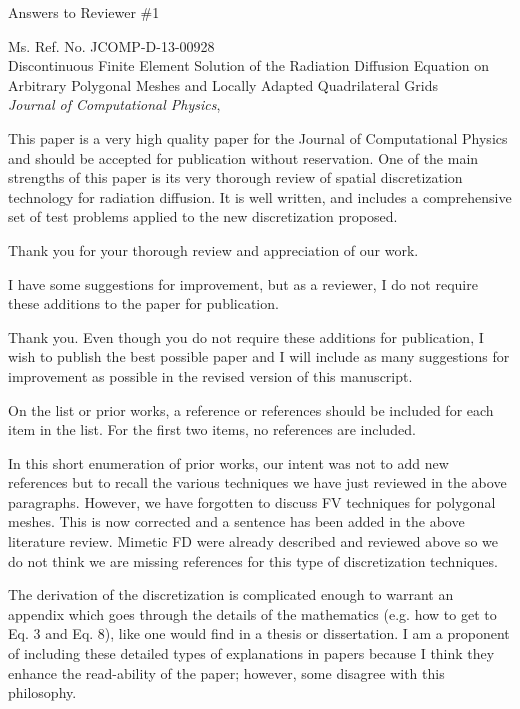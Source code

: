\documentclass{article}
\begin{document}
\begin{center}
{ \Large Answers to Reviewer \#1}
\end{center}

\bigskip

\noindent Ms. Ref. No. JCOMP-D-13-00928\\
Discontinuous Finite Element Solution of the Radiation Diffusion Equation on Arbitrary Polygonal Meshes and Locally Adapted Quadrilateral Grids\\
{\it Journal of Computational Physics},\\

\bigskip
\bigskip

{
\color{blue}
This paper is a very high quality paper for the Journal of Computational Physics and should be
accepted for publication without reservation. One of the main strengths of this paper is its very thorough
review of spatial discretization technology for radiation diffusion. It is well written, and includes a
comprehensive set of test problems applied to the new discretization proposed.
}

Thank you for your thorough review and appreciation of our work. 
\bigskip


{
\color{blue}
I have some suggestions for improvement, but as a reviewer, I do not require these additions to the paper
for publication.
}


Thank you. Even though you do not require these additions for publication, I wish to publish the best 
possible paper and I will include as many suggestions for improvement as possible in the revised version of 
this manuscript.
\bigskip



{
\color{blue}
On the list or prior works, a reference or references should be included for each item in the list. For the
first two items, no references are included.
}

In this short enumeration of prior works, our intent was not to add new references but to recall
the various techniques we have just reviewed in the above paragraphs. However, we have forgotten to 
discuss FV techniques for polygonal meshes. This is now corrected and a sentence has been added in the 
above literature review. Mimetic FD were already described and reviewed above so we do not think we are missing 
references for this type of discretization techniques. 
\bigskip

{
\color{blue}
The derivation of the discretization is complicated enough to warrant an appendix which goes through
the details of the mathematics (e.g. how to get to Eq. 3 and Eq. 8), like one would find in a thesis or
dissertation. I am a proponent of including these detailed types of explanations in papers because I think
they enhance the read-ability of the paper; however, some disagree with this philosophy.
}
\end{document}
